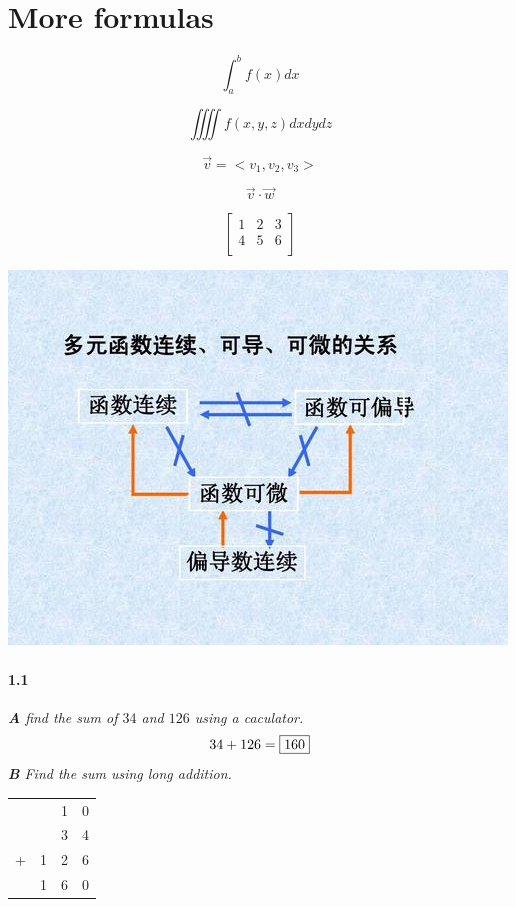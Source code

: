 \documentclass{article}
\begin{document}
\section*{More formulas}

$$\int_a^b{f(x)}dx$$

$$\iiiint f(x,y,z)dxdydz$$

$$\vec{v}=<v_1,v_2,v_3>$$

$$\vec{v}\cdot \vec{w}$$

$$\left[\begin{matrix}
1 & 2 & 3\\
4 & 5 & 6\\	
\end{matrix}\right]
$$

\begin{center}
	\includegraphics[scale = 0.5]{function.jpg}
\end{center}

\paragraph{1.1}
	\textit{
		\textbf{A} find the sum of $34$ and $126$ using a caculator.
	}
	$$ 34 + 126 = \framebox{$160$} $$
	\textit{
		\textbf{B} Find the sum using long addition.
	}
	\begin{center}
		\begin{tabular}{cccc}
			&   & 1 & 0\\
			&   & 3 & 4\\
		+	& 1 & 2 & 6\\
		\hline
			& 1 & 6 & 0 \\
		\end{tabular}
	\end{center}
\end{document}
